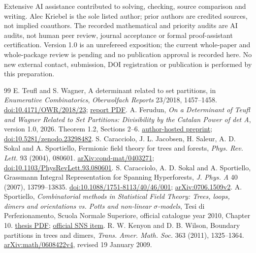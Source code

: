 \documentclass[11pt]{article}
\begin{document}
Extensive AI assistance contributed to solving, checking, source comparison and writing. Alec Kriebel is the sole listed author; prior authors are credited sources, not implied coauthors. The recorded mathematical and priority audits are AI audits, not human peer review, journal acceptance or formal proof-assistant certification. Version 1.0 is an unrefereed exposition; the current whole-paper and whole-package review is pending and no publication approval is recorded here. No new external contact, submission, DOI registration or publication is performed by this preparation.

\begin{thebibliography}{99}
 E. Teufl and S. Wagner, A determinant related to set partitions, in \emph{Enumerative Combinatorics}, \emph{Oberwolfach Reports} 23/2018, 1457--1458. \href{https://doi.org/10.4171/OWR/2018/23}{doi:10.4171/OWR/2018/23}; \href{https://ems.press/content/serial-article-files/46745}{report PDF}.
 A. Ferudun, \emph{On a Determinant of Teufl and Wagner Related to Set Partitions: Divisibility by the Catalan Power of det A}, version 1.0, 2026. Theorem 1.2, Sections 2--6. \href{https://eulersolve.org/papers/owr-16164-020/}{author-hosted preprint}; \href{https://doi.org/10.5281/zenodo.23298482}{doi:10.5281/zenodo.23298482}.
 S. Caracciolo, J. L. Jacobsen, H. Saleur, A. D. Sokal and A. Sportiello, Fermionic field theory for trees and forests, \emph{Phys. Rev. Lett.} 93 (2004), 080601. \href{https://arxiv.org/abs/cond-mat/0403271}{arXiv:cond-mat/0403271}; \href{https://doi.org/10.1103/PhysRevLett.93.080601}{doi:10.1103/PhysRevLett.93.080601}.
 S. Caracciolo, A. D. Sokal and A. Sportiello, Grassmann Integral Representation for Spanning Hyperforests, \emph{J. Phys. A} 40 (2007), 13799--13835. \href{https://doi.org/10.1088/1751-8113/40/46/001}{doi:10.1088/1751-8113/40/46/001}; \href{https://arxiv.org/pdf/0706.1509v2}{arXiv:0706.1509v2}.
 A. Sportiello, \emph{Combinatorial methods in Statistical Field Theory: Trees, loops, dimers and orientations vs. Potts and non-linear $\sigma$-models}, Tesi di Perfezionamento, Scuola Normale Superiore, official catalogue year 2010, Chapter 10. \href{https://pcteserver.mi.infn.it/~caraccio/PhD/Sportiello.pdf}{thesis PDF}; \href{https://ricerca.sns.it/handle/11384/85875}{official SNS item}.
 R. W. Kenyon and D. B. Wilson, Boundary partitions in trees and dimers, \emph{Trans. Amer. Math. Soc.} 363 (2011), 1325--1364. \href{https://arxiv.org/pdf/math/0608422v4}{arXiv:math/0608422v4}, revised 19 January 2009.

\end{thebibliography}
\end{document}
